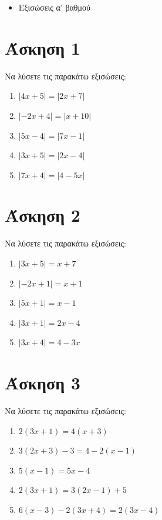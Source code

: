 \documentclass[a4paper,10pt]{report}
\begin{document}
\vspace{2em}
\begin{itemize}
\item Εξισώσεις α' βαθμού
\end{itemize}

\section*{Άσκηση 1  \hfill \small{}}
Να λύσετε τις παρακάτω εξισώσεις:
\begin{enumerate}[1)]
 \item $|4x+5|=|2x+7|$
 \item $|-2x+4|=|x+10|$
 \item $|5x-4|=|7x-1|$
 \item $|3x+5|=|2x-4|$
 \item $|7x+4|=|4-5x|$
\end{enumerate}


\section*{Άσκηση 2  \hfill \small{}}
Να λύσετε τις παρακάτω εξισώσεις:
\begin{enumerate}[1)]
 \item $|3x+5|=x+7$
 \item $|-2x+1|=x+1$
 \item $|5x+1|=x-1$
 \item $|3x+1|=2x-4$
 \item $|3x+4|=4-3x$
\end{enumerate}


\section*{Άσκηση 3  \hfill \small{}}
Να λύσετε τις παρακάτω εξισώσεις:
\begin{enumerate}[1)]
 \item $2(3x+1)=4(x+3)$
 \item $3(2x+3)-3=4-2(x-1)$
 \item $5(x-1)=5x-4$
 \item $2(3x+1)=3(2x-1)+5$
 \item $6(x-3)-2(3x+4)=2(3x-4)$
\end{enumerate}
\end{document}
